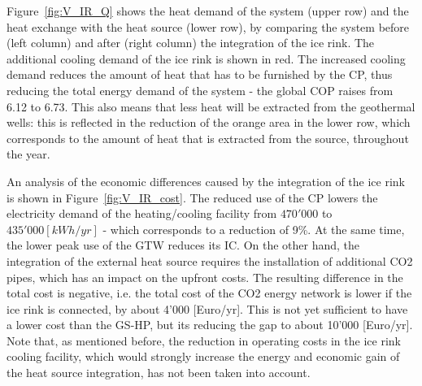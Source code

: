 \documentclass{article}
\begin{document}
Figure~\ref{fig:V_IR_Q} shows the heat demand of the system (upper row) and the heat exchange with the heat source (lower row), by comparing the system before (left column) and after (right column) the integration of the ice rink. The additional cooling demand of the ice rink is shown in red. The increased cooling demand reduces the amount of heat that has to be furnished by the CP, thus reducing the total energy demand of the system - the global COP raises from 6.12 to 6.73. This also means that less heat will be extracted from the geothermal wells: this is reflected in the reduction of the orange area in the lower row, which corresponds to the amount of heat that is extracted from the source, throughout the year.


An analysis of the economic differences caused by the integration of the ice rink is shown in Figure~\ref{fig:V_IR_cost}. The reduced use of the CP lowers the electricity demand of the heating/cooling facility from $470'000$ to $435'000 [kWh/yr]$ - which corresponds to a reduction of 9\%. At the same time, the lower peak use of the GTW reduces its IC. On the other hand, the integration of the external heat source requires the installation of additional CO2 pipes, which has an impact on the upfront costs. The resulting difference in the total cost is negative, i.e. the total cost of the CO2 energy network is lower if the ice rink is connected, by about 4'000 [Euro/yr]. This is not yet sufficient to have a lower cost than the GS-HP, but its reducing the gap to about 10'000 [Euro/yr]. Note that, as mentioned before, the reduction in operating costs in the ice rink cooling facility, which would strongly increase the energy and economic gain of the heat source integration, has not been taken into account.\\

%
\end{document}
